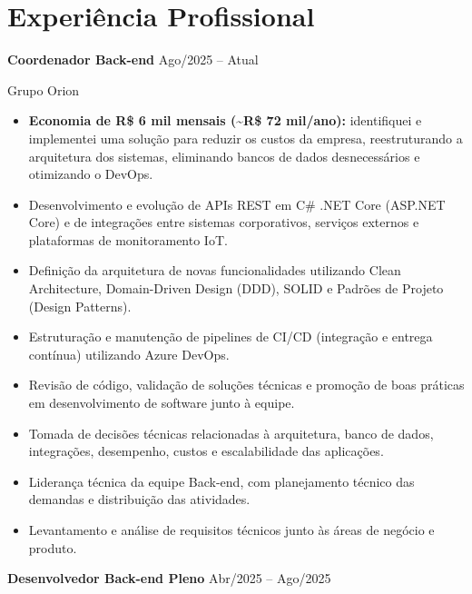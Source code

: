 \documentclass[11pt,a4paper]{article}
\begin{document}
\section{Experiência Profissional}

\textbf{Coordenador Back-end}
\hfill Ago/2025 -- Atual

Grupo Orion

\begin{itemize}[leftmargin=*,noitemsep,topsep=2pt]

\item \textbf{Economia de R\$ 6 mil mensais (\textasciitilde R\$ 72 mil/ano):} identifiquei e implementei uma solução para reduzir os custos da empresa, reestruturando a arquitetura dos sistemas, eliminando bancos de dados desnecessários e otimizando o DevOps.

\item Desenvolvimento e evolução de APIs REST em C\# .NET Core (ASP.NET Core) e de integrações entre sistemas corporativos, serviços externos e plataformas de monitoramento IoT.

\item Definição da arquitetura de novas funcionalidades utilizando Clean Architecture, Domain-Driven Design (DDD), SOLID e Padrões de Projeto (Design Patterns).

\item Estruturação e manutenção de pipelines de CI/CD (integração e entrega contínua) utilizando Azure DevOps.

\item Revisão de código, validação de soluções técnicas e promoção de boas práticas em desenvolvimento de software junto à equipe.

\item Tomada de decisões técnicas relacionadas à arquitetura, banco de dados, integrações, desempenho, custos e escalabilidade das aplicações.

\item Liderança técnica da equipe Back-end, com planejamento técnico das demandas e distribuição das atividades.

\item Levantamento e análise de requisitos técnicos junto às áreas de negócio e produto.

\end{itemize}

\vspace{0.2cm}

\textbf{Desenvolvedor Back-end Pleno}
\hfill Abr/2025 -- Ago/2025
\end{document}

